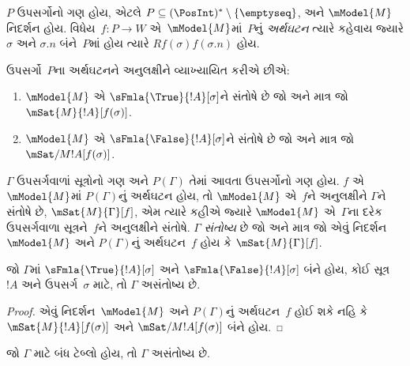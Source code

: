 \begin{defn}
  $P$ ઉપસર્ગોનો ગણ હોય, એટલે $P \subseteq (\PosInt)^*
  \setminus \{\emptyseq\}$, અને $\mModel{M}$ નિદર્શન હોય.
  વિધેય~$f\colon P \to W$ એ~$\mModel{M}$માં~$P$નું
  \emph{અર્થઘટન} ત્યારે કહેવાય જ્યારે $\sigma$ અને $\sigma.n$
  બંને~$P$માં હોય ત્યારે $Rf(\sigma)f(\sigma.n)$ હોય.

  ઉપસર્ગો~$P$ના અર્થઘટનને અનુલક્ષીને વ્યાખ્યાયિત કરીએ છીએ:
  \begin{enumerate}
  \item $\mModel{M}$ એ $\sFmla{\True}{!A}[\sigma]$ને સંતોષે છે
    જો અને માત્ર જો
    $\mSat{M}{!A}[f(\sigma)]$.
  \item $\mModel{M}$ એ $\sFmla{\False}{!A}[\sigma]$ને સંતોષે છે
    જો અને માત્ર જો
    $\mSat/{M}{!A}[f(\sigma)]$.
  \end{enumerate}
\end{defn}

\begin{defn}
  $\Gamma$ ઉપસર્ગવાળાં સૂત્રોનો ગણ અને $P(\Gamma)$ તેમાં
  આવતા ઉપસર્ગોનો ગણ હોય. $f$ એ~$\mModel{M}$માં
  $P(\Gamma)$નું અર્થઘટન હોય, તો $\mModel{M}$ એ~$f$ને અનુલક્ષીને
  $\Gamma$ને સંતોષે છે, $\mSat{M}{\Gamma}[f]$, એમ ત્યારે કહીએ
  જ્યારે $\mModel{M}$ એ~$\Gamma$ના દરેક ઉપસર્ગવાળા
  સૂત્રને~$f$ને અનુલક્ષીને સંતોષે. $\Gamma$
  \emph{સંતોષ્ય} છે જો અને માત્ર જો એવું નિદર્શન~$\mModel{M}$
  અને $P(\Gamma)$નું અર્થઘટન~$f$ હોય કે
  $\mSat{M}{\Gamma}[f]$.
\end{defn}

\begin{prop}
  જો $\Gamma$માં $\sFmla{\True}{!A}[\sigma]$ અને
  $\sFmla{\False}{!A}[\sigma]$ બંને હોય, કોઈ સૂત્ર~$!A$
  અને ઉપસર્ગ~$\sigma$ માટે, તો $\Gamma$ અસંતોષ્ય છે.
\end{prop}

\begin{proof}
  એવું નિદર્શન~$\mModel{M}$ અને $P(\Gamma)$નું અર્થઘટન~$f$
  હોઈ શકે નહિ કે $\mSat{M}{!A}[f(\sigma)]$ અને
  $\mSat/{M}{!A}[f(\sigma)]$ બંને હોય.
\end{proof}

\begin{thm}[યથાર્થતા]
  જો $\Gamma$ માટે બંધ ટેબ્લો હોય, તો $\Gamma$ અસંતોષ્ય છે.
\end{thm}

